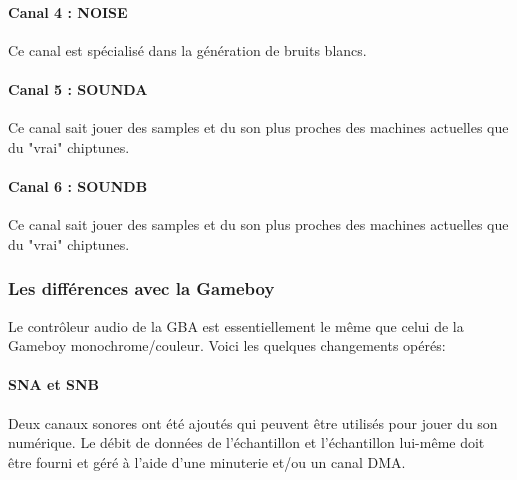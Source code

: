 \documentclass[12pt,a4paper]{article}
\begin{document}
        
        \paragraph{Canal 4 : NOISE} Ce canal est spécialisé dans la génération de bruits blancs.
        
        
        \paragraph{Canal 5 : SOUNDA} Ce canal sait jouer des samples et du son plus proches des machines actuelles que du "vrai" chiptunes. 
        
        
        \paragraph{Canal 6 : SOUNDB} Ce canal sait jouer des samples et du son plus proches des machines actuelles que du "vrai" chiptunes. 
        
        
        \subsubsection{Les différences avec la Gameboy}
        
        Le contrôleur audio de la GBA est essentiellement le même que celui de la Gameboy monochrome/couleur. Voici les quelques changements opérés:
        
            \paragraph{SNA et SNB} Deux canaux sonores ont été ajoutés qui peuvent être utilisés pour jouer du son numérique. Le débit de données de l'échantillon et l'échantillon lui-même doit être fourni et géré à l'aide d'une minuterie et/ou un canal DMA.
            
\end{document}

